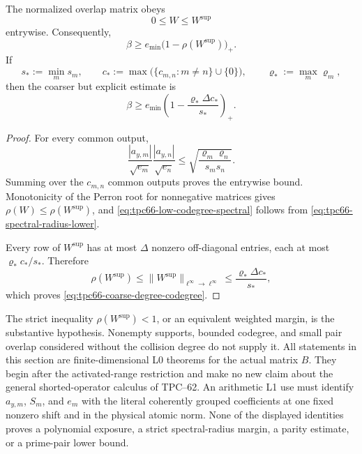 \begin{proposition}
\label{prop:tpc66-low-codegree}
The normalized overlap matrix obeys
\[
 0\le W\le W^{\mathrm{sup}}
\]
entrywise.  Consequently,
\begin{equation}
 \boxed{
 \beta
 \ge
 e_{\min}
 \bigl(1-\rho(W^{\mathrm{sup}})\bigr)_+.}
 \label{eq:tpc66-low-codegree-spectral}
\end{equation}
If
\[
 s_*:=\min_m s_m,\qquad
 c_*:=\max\bigl(\{c_{m,n}:m\ne n\}\cup\{0\}\bigr),\qquad
 \varrho_*:=\max_m\varrho_m,
\]
then the coarser but explicit estimate is
\begin{equation}
 \boxed{
 \beta
 \ge
 e_{\min}
 \left(
 1-\frac{\varrho_*\Delta c_*}{s_*}
 \right)_+.}
 \label{eq:tpc66-coarse-degree-codegree}
\end{equation}
\end{proposition}

\begin{proof}
For every common output,
\[
 \frac{|a_{y,m}|}{\sqrt{e_m}}
 \frac{|a_{y,n}|}{\sqrt{e_n}}
 \le
 \sqrt{\frac{\varrho_m\varrho_n}{s_ms_n}}.
\]
Summing over the \(c_{m,n}\) common outputs proves the entrywise bound.
Monotonicity of the Perron root for nonnegative matrices gives
\(\rho(W)\le\rho(W^{\mathrm{sup}})\), and
\eqref{eq:tpc66-low-codegree-spectral} follows from
\eqref{eq:tpc66-spectral-radius-lower}.

Every row of \(W^{\mathrm{sup}}\) has at most \(\Delta\) nonzero
off-diagonal entries, each at most
\(\varrho_*c_*/s_*\).  Therefore
\[
 \rho(W^{\mathrm{sup}})
 \le\|W^{\mathrm{sup}}\|_{\ell^\infty\to\ell^\infty}
 \le\frac{\varrho_*\Delta c_*}{s_*},
\]
which proves \eqref{eq:tpc66-coarse-degree-codegree}.
\end{proof}

\begin{remark}
\label{rem:tpc66-support-claim-level}
The strict inequality
\(\rho(W^{\mathrm{sup}})<1\), or an equivalent weighted margin, is the
substantive hypothesis.  Nonempty supports, bounded codegree, and small
pair overlap considered without the collision degree do not supply it.
All statements in this section are finite-dimensional L0 theorems for the
actual matrix \(B\).  They begin after the activated-range restriction and
make no new claim about the general shorted-operator calculus of TPC--62.
An arithmetic L1 use must identify \(a_{y,m}\), \(S_m\), and \(e_m\) with
the literal coherently grouped coefficients at one fixed nonzero shift and
in the physical atomic norm.  None of the displayed identities proves a
polynomial exposure, a strict spectral-radius margin, a parity estimate, or
a prime-pair lower bound.
\end{remark}
